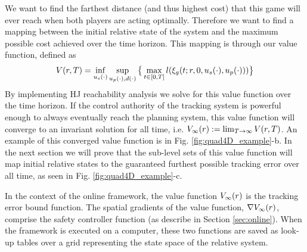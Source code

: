  We want to find the farthest distance (and thus highest cost) that this game will ever reach when both players are acting optimally. Therefore we want to find a mapping between the initial relative state of the system and the maximum possible cost achieved over the time horizon. This mapping is through our value function, defined as
 \begin{equation}
 \begin{aligned}
 \label{eq:valfunc}
 	V(r,T)= \inf_{u_s(\cdot)} \sup_{u_p(\cdot), d(\cdot)}  \big\{\max_{t\in [0, T]} l(\xi_g(t; r, 0, u_s(\cdot), u_p(\cdot)))\big\}
 	\end{aligned}
 \end{equation} 
 By implementing HJ reachability analysis we solve for this value function over the time horizon. If the control authority of the tracking system is powerful enough to always eventually reach the planning system, this value function will converge to an invariant solution for all time, i.e. $V_\infty(r) := \lim_{T\rightarrow\infty} V(r, T)$. An example of this converged value function is in Fig. \ref{fig:quad4D_example}-b. In the next section we will prove that the sub-level sets of this value function will map initial relative states to the guaranteed furthest possible tracking error over all time, as seen in Fig. \ref{fig:quad4D_example}-c.
 
In the context of the online framework, the value function $V_\infty(r)$ is the tracking error bound function. The spatial gradients of the value function, $\nabla V_\infty(r)$, comprise the safety controller function (as describe in Section \ref{sec:online}). When the framework is executed on a computer, these two functions are saved as look-up tables over a grid representing the state space of the relative system.
 
